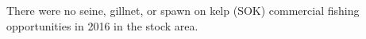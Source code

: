 There were no seine, gillnet, or spawn on kelp (SOK) commercial fishing opportunities in 2016 in the \regionName{} \regionType{} stock area.